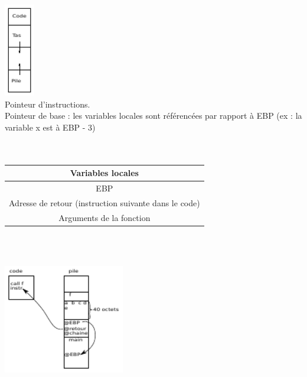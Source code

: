  \\
\includegraphics[width=50px]{Images/15_Ram.pdf}\\

 Pointeur d'instructions. \\

 Pointeur de base : les variables locales sont référencées par rapport à EBP (ex : la variable x est à EBP - 3) \\

 \\ \\
\begin{tabular}{|c|} \hline
	Variables locales \\ \hline
	EBP \\ \hline
	Adresse de retour (instruction suivante dans le code) \\ \hline
	Arguments de la fonction \\ \hline
\end{tabular}\\

\newpage

 \\
\includegraphics[width=200px]{Images/16_ExemplePile.pdf}\\

